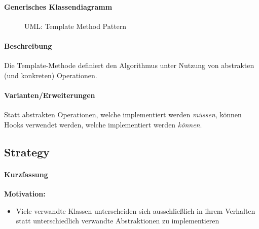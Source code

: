 			\paragraph{Generisches Klassendiagramm}
				\begin{figure}[ht]
					\centering
					\caption{UML: Template Method Pattern}
				\end{figure}
			
			\paragraph{Beschreibung}
				Die Template-Methode definiert den Algorithmus unter Nutzung von abstrakten (und konkreten) Operationen.
				
			\paragraph{Varianten/Erweiterungen}
				Statt abstrakten Operationen, welche implementiert werden \textit{müssen}, können Hooks verwendet werden, welche implementiert werden \textit{können}.
		
		\subsection{Strategy}
			\paragraph{Kurzfassung}
				\textbf{Motivation:}
					\begin{itemize}
						\item Viele verwandte Klassen unterscheiden sich ausschließlich in ihrem Verhalten statt unterschiedlich verwandte Abstraktionen zu implementieren
					\end{itemize}
			
